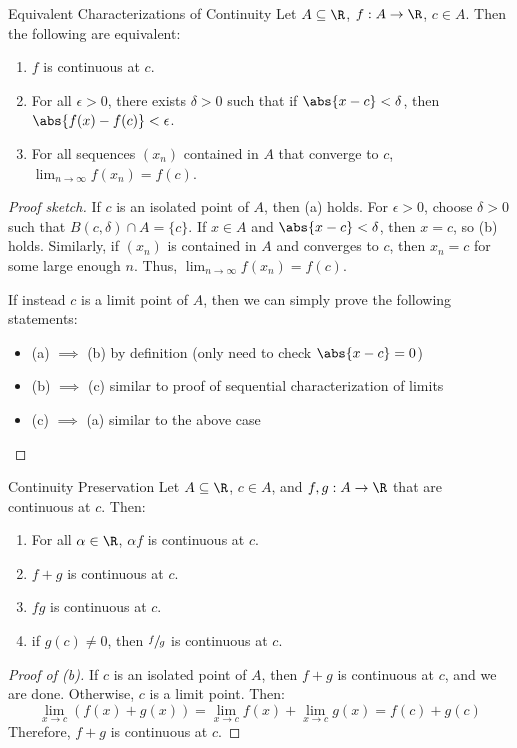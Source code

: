\begin{thmbox}{Equivalent Characterizations of Continuity}{}
    Let $A \subseteq \R$, $f : A \to \R$, $c \in A$. Then the following are equivalent:
    \begin{enumerate}[label=(\alph*)]
        \item $f$ is continuous at $c$.
        \item For all $\epsilon > 0$, there exists $\delta > 0$ such that if $\abs{x-c} < \delta$, then $\abs{f(x) - f(c)} < \epsilon$.
        \item For all sequences $(x_n)$ contained in $A$ that converge to $c$, $\lim_{n\to\infty} f(x_n) = f(c)$.
    \end{enumerate}
    \tcblower
    \begin{proof}[Proof sketch]
        If $c$ is an isolated point of $A$, then (a) holds. For $\epsilon > 0$, choose $\delta > 0$ such that $B(c, \delta) \cap A = \{c\}$. If $x \in A$ and $\abs{x-c} < \delta$, then $x = c$, so (b) holds. Similarly, if $(x_n)$ is contained in $A$ and converges to $c$, then $x_n = c$ for some large enough $n$. Thus, $\lim_{n\to\infty} f(x_n) = f(c)$.

        If instead $c$ is a limit point of $A$, then we can simply prove the following statements:
        \begin{itemize}
            \item (a) $\implies$ (b) by definition (only need to check $\abs{x-c} = 0$)
            \item (b) $\implies$ (c) similar to proof of sequential characterization of limits
            \item (c) $\implies$ (a) similar to the above case
        \end{itemize}
    \end{proof}
\end{thmbox}

\begin{thmbox}{Continuity Preservation}{}
    Let $A \subseteq \R$, $c \in A$, and $f,g : A \to \R$ that are continuous at $c$. Then:
    \begin{enumerate}[label=(\alph*)]
        \item For all $\alpha \in \R$, $\alpha f$ is continuous at $c$.
        \item $f + g$ is continuous at $c$.
        \item $fg$ is continuous at $c$.
        \item if $g(c) \neq 0$, then $\sfrac{f}{g}$ is continuous at $c$.
    \end{enumerate}
    \tcblower
    \begin{proof}[Proof of (b)]
        If $c$ is an isolated point of $A$, then $f+g$ is continuous at $c$, and we are done. Otherwise, $c$ is a limit point. Then:
        \[ \lim_{x \to c} (f(x) + g(x)) = \lim_{x \to c} f(x) + \lim_{x \to c} g(x) = f(c) + g(c) \]
        Therefore, $f+g$ is continuous at $c$.
    \end{proof}
\end{thmbox}

